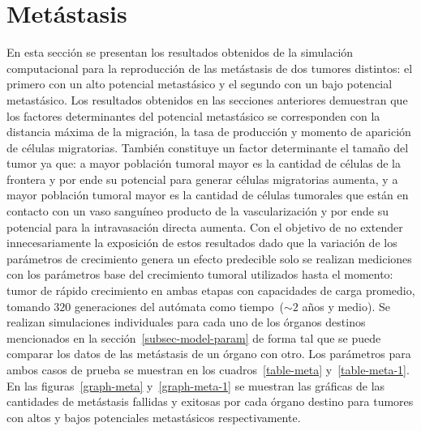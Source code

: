 \section{Met\'astasis}
\label{sec-metastasis-results}
En esta secci\'on se presentan los resultados obtenidos de la simulaci\'on computacional para la reproducci\'on de las met\'astasis de dos tumores distintos: el primero con un alto potencial metast\'asico y el segundo con un bajo potencial metast\'asico. Los resultados obtenidos en las secciones anteriores demuestran que los factores determinantes del potencial metast\'asico se corresponden con la distancia m\'axima de la migraci\'on, la tasa de producci\'on y momento de aparici\'on de c\'elulas migratorias. Tambi\'en constituye un factor determinante el tama\~no del tumor ya que: a mayor poblaci\'on tumoral mayor es la cantidad de c\'elulas de la frontera y por ende su potencial para generar c\'elulas migratorias aumenta, y a mayor poblaci\'on tumoral mayor es la cantidad de c\'elulas tumorales que est\'an en contacto con un vaso sangu\'ineo producto de la vascularizaci\'on y por ende su potencial para la intravasaci\'on directa aumenta. Con el objetivo de no extender innecesariamente la exposici\'on de estos resultados dado que la variaci\'on de los par\'ametros de crecimiento genera un efecto predecible solo se realizan mediciones con los par\'ametros base del crecimiento tumoral utilizados hasta el momento: tumor de r\'apido crecimiento en ambas etapas con capacidades de carga promedio, tomando $320$ generaciones del aut\'omata como tiempo~($\sim 2$ a\~nos y medio). Se realizan simulaciones individuales para cada uno de los \'organos destinos mencionados en la secci\'on~\ref{subsec-model-param} de forma tal que se puede comparar los datos de las met\'astasis de un \'organo con otro. Los par\'ametros para ambos casos de prueba se muestran en los cuadros~\ref{table-meta} y~\ref{table-meta-1}. En las figuras~\ref{graph-meta} y~\ref{graph-meta-1} se muestran las gr\'aficas de las cantidades de met\'astasis fallidas y exitosas por cada \'organo destino para tumores con altos y bajos potenciales metast\'asicos respectivamente. 
\begin{table}[!ht]
\begin{center}
\vspace*{-0.6cm}
\end{center}
\caption[Par\'ametros para la obtenci\'on de datos de un carcinoma ductal infiltrante con alto potencial metast\'asico]{Par\'ametros para la obtenci\'on de datos de un carcinoma ductal infiltrante con alto potencial metast\'asico.}
\label{table-meta}
\end{table}

